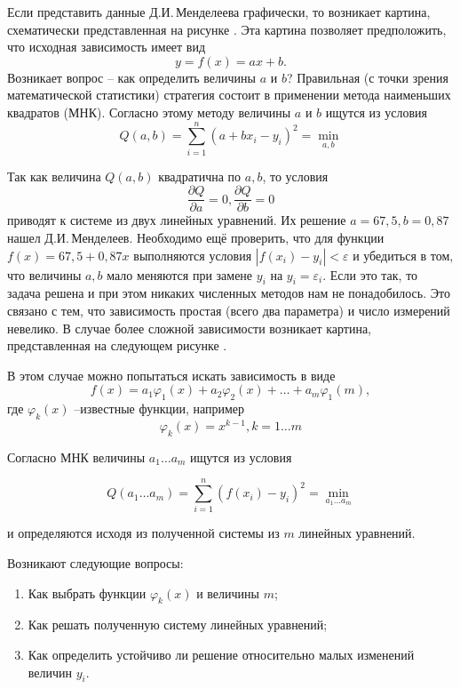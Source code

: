 Если представить данные Д.И.\,Менделеева графически, то возникает картина, схематически представленная на рисунке . 
Эта картина позволяет предположить, что исходная зависимость имеет вид 
\begin{equation}
	y = f(x) = ax + b.
\end{equation}
 Возникает вопрос -- как определить величины $a$ и $b$?  Правильная (с точки зрения математической статистики) стратегия состоит в применении метода наименьших квадратов (МНК). Согласно этому методу величины $a$ и $b$ ищутся  из условия 
 \begin{equation}
	Q(a, b) = \sum^n_{i=1}{(a+bx_i -y_i)^2} = \min_{a,b}
\end{equation}

Так как величина $Q(a,b)$ квадратична по $a,b$, то условия
\begin{equation}
	\frac{\partial Q}{\partial a} = 0,    \frac{\partial Q}{\partial b} = 0
\end{equation}
приводят к системе из двух линейных уравнений. Их решение $a = 67,5, b = 0,87$ нашел Д.И.\,Менделеев. Необходимо ещё проверить, что для функции $f(x) = 67,5 + 0,87x$ выполняются условия $|f(x_i) - y_i| < \varepsilon$ и убедиться в том, что величины $a,b$ мало меняются при замене $y_i$ на $y_i = \varepsilon _i$. Если это так, то задача решена и при этом никаких численных методов нам не понадобилось. Это связано с тем, что зависимость простая (всего два параметра) и число измерений невелико. В случае более сложной зависимости возникает картина, представленная на следующем рисунке .

В этом случае можно попытаться искать зависимость в виде 
\begin{equation} \label{eq:representation}
	f(x) = a_1 \varphi _1(x) + a_2 \varphi _2(x) + \dots + a_m \varphi _1(m),
\end{equation}
где $\varphi _k(x)$ --известные функции, например
\begin{equation}
	\varphi _k(x) = x^{k-1},  k = 1 \dots m
\end{equation}

Согласно МНК величины $a_1 \dots a_m$ ищутся из условия

 \begin{equation}
	Q(a_1 \dots a_m) = \sum^n_{i=1}{(f(x_i) -y_i)^2} = \min_{a_1 \dots a_m}
\end{equation}

и определяются исходя из полученной системы из $m$ линейных уравнений.

Возникают следующие вопросы:
\begin{enumerate}
	\item Как выбрать функции $\varphi _k(x)$ и величины $m$;
	\item Как решать полученную систему линейных уравнений;
	\item Как определить устойчиво ли решение относительно малых изменений величин $y_i$.
\end{enumerate}


